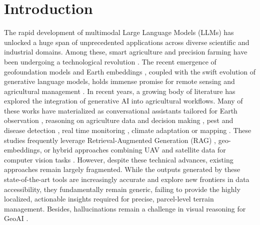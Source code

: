 \documentclass[preprint,review,12pt,authoryear]{elsarticle}
\begin{document}

\linenumbers


\section{Introduction}
\label{sec:Introduction}

The rapid development of multimodal Large Language Models (LLMs) has unlocked a huge span of unprecedented applications across diverse scientific and industrial domains. Among these, smart agriculture and precision farming have been undergoing a technological revolution \citep{Sapkota202522510, Shaikh2025117}. The recent emergence of geofoundation models \citep{Huang2025, young_how_2026} and Earth embeddings \citep{earth_embeddings}, coupled with the swift evolution of generative language models, holds immense promise for remote sensing and agricultural management \citep{li_foundation_2024, lu_agi_2023,tan_promises_2023,Yang2025,yang_survey_2025,geofoundation_2023, geofoundation_2026}. In recent years, a growing body of literature has explored the integration of generative AI into agricultural workflows. Many of these works have materialized as conversational assistants tailored for Earth observation \citep{yuan_omnigeo_2025, kuckreja_geochat_2023, soni_earthdial_2025, zhang_spatial_2023, yuan_easy_2022, kuckreja_geochat_2023,hu_rsgpt_2023}, reasoning on agriculture data and decision making \citep{eldem_development_2026, gu_plantexpert_2026, koopman_agask_2024, xu_multimodal_2025, silva_gpt4_2023, zhao_chatagri_2023, kuska_ai_2024, yang_pllama_2024}, pest and disease detection \citep{llava_2024,cao_cucumber_2023}, real time monitoring \citep{liu_agrosense_2026}, climate adaptation \citep{nguyen_my_2024} or mapping \citep{zhang_mapgpt_2024}. These studies frequently leverage Retrieval-Augmented Generation (RAG) \citep{wang_llm-rag_2026,balaguer_rag_2024}, geo-embeddings, or hybrid approaches combining UAV and satellite data for computer vision tasks \citep{lacerda_christian_agroview_2024,alvarez-vanhard_uav_2021,sona_uav_2016}. However, despite these technical advances, existing approaches remain largely fragmented. While the outputs generated by these state-of-the-art tools are increasingly accurate and explore new frontiers in data accessibility, they fundamentally remain generic, failing to provide the highly localized, actionable insights required for precise, parcel-level terrain management. Besides, hallucinations remain a challenge in visual reasoning for GeoAI \citep{ghose_hallucination_2026,jiang_active_2023}.
\end{document}
